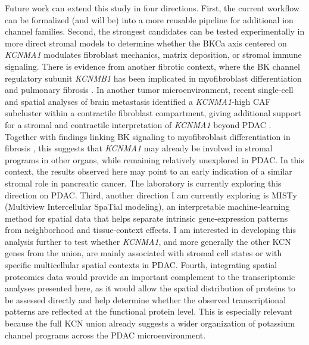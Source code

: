 \documentclass[11pt,a4paper]{article}
\begin{document}
Future work can extend this study in four directions. First, the current workflow can be formalized (and will be) into a more reusable pipeline for additional ion channel families. Second, the strongest candidates can be tested experimentally in more direct stromal models to determine whether the BKCa axis centered on \textit{KCNMA1} modulates fibroblast mechanics, matrix deposition, or stromal immune signaling. There is evidence from another fibrotic context, where the BK channel regulatory subunit \textit{KCNMB1} has been implicated in myofibroblast differentiation and pulmonary fibrosis \citep{scruggs2020}. In another tumor microenvironment, recent single-cell and spatial analyses of brain metastasis identified a \textit{KCNMA1}-high CAF subcluster within a contractile fibroblast compartment, giving additional support for a stromal and contractile interpretation of \textit{KCNMA1} beyond PDAC \citep{simon2026}. Together with findings linking BK signaling to myofibroblast differentiation in fibrosis \citep{scruggs2020}, this suggests that \textit{KCNMA1} may already be involved in stromal programs in other organs, while remaining relatively unexplored in PDAC. In this context, the results observed here may point to an early indication of a similar stromal role in pancreatic cancer. The laboratory is currently exploring this direction on PDAC. Third, another direction I am currently exploring is MISTy (Multiview Intercellular SpaTial modeling), an interpretable machine-learning method for spatial data that helps separate intrinsic gene-expression patterns from neighborhood and tissue-context effects. I am interested in developing this analysis further to test whether \textit{KCNMA1}, and more generally the other KCN genes from the union, are mainly associated with stromal cell states or with specific multicellular spatial contexts in PDAC. Fourth, integrating spatial proteomics data would provide an important complement to the transcriptomic analyses presented here, as it would allow the spatial distribution of proteins to be assessed directly and help determine whether the observed transcriptional patterns are reflected at the functional protein level. This is especially relevant because the full KCN union already suggests a wider organization of potassium channel programs across the PDAC microenvironment.

\end{document}
